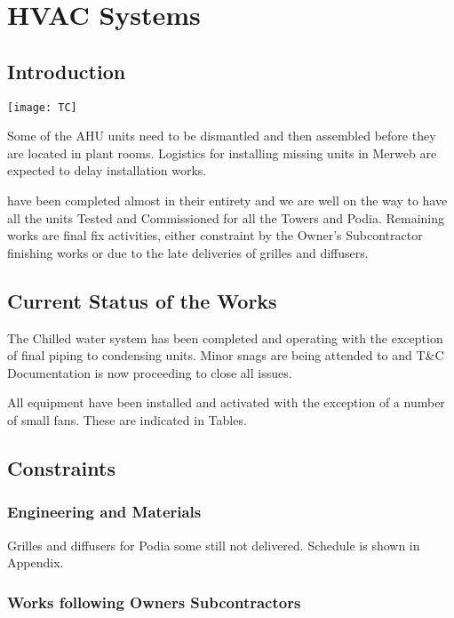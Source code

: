 \chapter{HVAC Systems}
\section{Introduction  \label{HVAC}}
\begin{marginfigure}%
  \texttt{[image: TC]}
  \caption{Some of the AHU units need to be dismantled and then assembled before they are located in plant rooms. Logistics for installing missing units in Merweb are expected to delay installation works.}
  \label{fig:marginfig1}
\end{marginfigure}

 have been completed almost in their entirety and we are well
on the way to have all the units Tested and Commissioned for all the Towers and Podia. Remaining
works are final fix activities, either constraint by the Owner's Subcontractor finishing works or
due to the late deliveries of grilles and diffusers.

\section{Current Status of the Works}

The Chilled water system has been completed and operating with the exception of final piping to
condensing units. Minor snags are being attended to and T\&C Documentation is now proceeding  to close all issues.

All equipment have been installed and activated with the exception of a number of small fans. These are indicated in Tables.

\section{Constraints}
\subsection{Engineering and Materials}

Grilles and diffusers for Podia some still not delivered. Schedule is shown in Appendix.

\subsection{Works following Owners Subcontractors}

